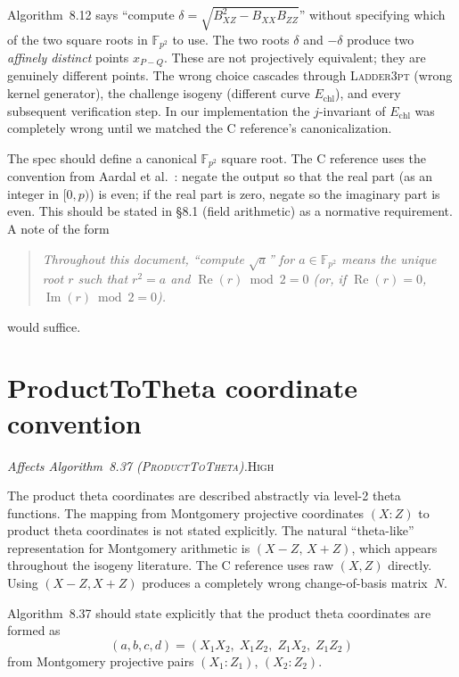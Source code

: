\documentclass[a4paper,11pt]{article}
\newcommand{\algo}[1]{Algorithm~#1}
\newcommand{\Fpii}{\mathbb{F}_{p^2}}
\newcommand{\high}{\textsc{\color{BurntOrange}High}}
\newcommand{\finding}[2]{\noindent\textit{#1}\hfill#2\par\smallskip}
\begin{document}
\algo{8.12} says ``compute $\delta = \sqrt{B_{XZ}^2 - B_{XX} B_{ZZ}}$''
without specifying which of the two square roots in $\Fpii$ to use.
The two roots $\delta$ and $-\delta$ produce two \emph{affinely distinct}
points $x_{P-Q}$.  These are not projectively equivalent; they are
genuinely different points.  The wrong choice cascades through
\textsc{Ladder3pt} (wrong kernel generator), the challenge isogeny
(different curve $E_{\text{chl}}$), and every subsequent verification
step.  In our implementation the $j$-invariant of $E_{\text{chl}}$ was
completely wrong until we matched the C reference's canonicalization.

The spec should define a canonical $\Fpii$ square root.  The C reference
uses the convention from Aardal et al.~\cite{ABCDK24}: negate the
output so that the real part (as an integer in $[0, p)$) is even; if the
real part is zero, negate so the imaginary part is even.  This should be
stated in \S8.1 (field arithmetic) as a normative requirement.  A note
of the form
\begin{quote}
  \itshape Throughout this document, ``compute $\sqrt{a}$'' for
  $a \in \Fpii$ means the unique root $r$ such that $r^2 = a$ and
  $\operatorname{Re}(r) \bmod 2 = 0$ (or, if $\operatorname{Re}(r)=0$,
  $\operatorname{Im}(r) \bmod 2 = 0$).
\end{quote}
would suffice.

\section{ProductToTheta coordinate convention}
\label{sec:product-to-theta}

\finding{Affects \algo{8.37} (\textsc{ProductToTheta}).}{\high}

The product theta coordinates are described abstractly via level-2 theta
functions.  The mapping from Montgomery projective coordinates $(X:Z)$ to
product theta coordinates is not stated explicitly.  The natural
``theta-like'' representation for Montgomery arithmetic is $(X-Z,\,X+Z)$,
which appears throughout the isogeny literature.  The C reference uses
raw $(X, Z)$ directly.  Using $(X-Z, X+Z)$ produces a completely wrong
change-of-basis matrix~$N$.

\algo{8.37} should state explicitly that the product theta coordinates
are formed as
\[
  (a, b, c, d) = (X_1 X_2,\; X_1 Z_2,\; Z_1 X_2,\; Z_1 Z_2)
\]
from Montgomery projective pairs $(X_1 : Z_1)$, $(X_2 : Z_2)$.
\end{document}
